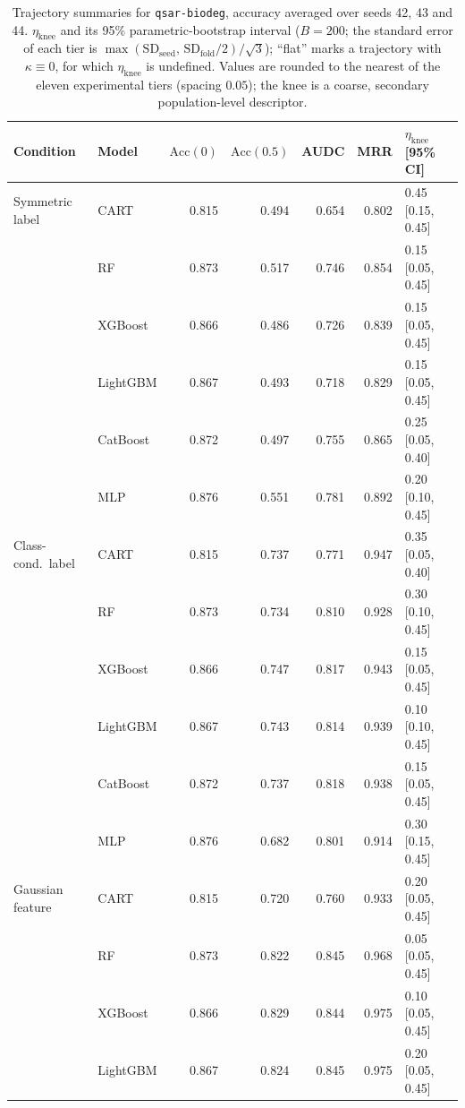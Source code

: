 \documentclass[pdflatex,sn-mathphys]{sn-jnl}
\theoremstyle{thmstyleone}
\begin{document}
\begin{table}[htbp]
\centering
\scriptsize
\setlength{\tabcolsep}{3.5pt}
\caption{Trajectory summaries for \texttt{qsar-biodeg}, accuracy averaged over seeds 42, 43 and 44. $\eta_{\mathrm{knee}}$ and its 95\% parametric-bootstrap interval ($B=200$; the standard error of each tier is $\max(\mathrm{SD}_{\mathrm{seed}},\,\mathrm{SD}_{\mathrm{fold}}/2)/\sqrt3$); ``flat'' marks a trajectory with $\kappa\equiv 0$, for which $\eta_{\mathrm{knee}}$ is undefined. Values are rounded to the nearest of the eleven experimental tiers (spacing $0.05$); the knee is a coarse, secondary population-level descriptor.}
\label{tab:traj_qsar_biodeg}
\begin{tabular}{@{}llrrrrl@{}}
\toprule
Condition & Model & $\mathrm{Acc}(0)$ & $\mathrm{Acc}(0.5)$ & AUDC & MRR & $\eta_{\mathrm{knee}}$ [95\% CI] \\
\midrule
Symmetric label & CART & 0.815 & 0.494 & 0.654 & 0.802 & 0.45 [0.15, 0.45] \\
 & RF & 0.873 & 0.517 & 0.746 & 0.854 & 0.15 [0.05, 0.45] \\
 & XGBoost & 0.866 & 0.486 & 0.726 & 0.839 & 0.15 [0.05, 0.45] \\
 & LightGBM & 0.867 & 0.493 & 0.718 & 0.829 & 0.15 [0.05, 0.45] \\
 & CatBoost & 0.872 & 0.497 & 0.755 & 0.865 & 0.25 [0.05, 0.40] \\
 & MLP & 0.876 & 0.551 & 0.781 & 0.892 & 0.20 [0.10, 0.45] \\
\midrule
Class-cond.\ label & CART & 0.815 & 0.737 & 0.771 & 0.947 & 0.35 [0.05, 0.40] \\
 & RF & 0.873 & 0.734 & 0.810 & 0.928 & 0.30 [0.10, 0.45] \\
 & XGBoost & 0.866 & 0.747 & 0.817 & 0.943 & 0.15 [0.05, 0.45] \\
 & LightGBM & 0.867 & 0.743 & 0.814 & 0.939 & 0.10 [0.10, 0.45] \\
 & CatBoost & 0.872 & 0.737 & 0.818 & 0.938 & 0.15 [0.05, 0.45] \\
 & MLP & 0.876 & 0.682 & 0.801 & 0.914 & 0.30 [0.15, 0.45] \\
\midrule
Gaussian feature & CART & 0.815 & 0.720 & 0.760 & 0.933 & 0.20 [0.05, 0.45] \\
 & RF & 0.873 & 0.822 & 0.845 & 0.968 & 0.05 [0.05, 0.45] \\
 & XGBoost & 0.866 & 0.829 & 0.844 & 0.975 & 0.10 [0.05, 0.45] \\
 & LightGBM & 0.867 & 0.824 & 0.845 & 0.975 & 0.20 [0.05, 0.45] \\

\end{tabular}
\end{table}
\end{document}
